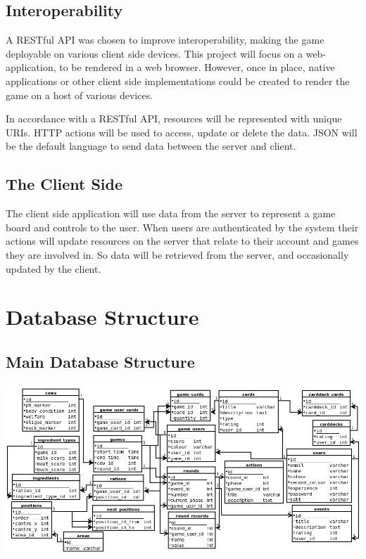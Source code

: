 \subsection{Interoperability}
A RESTful API was chosen to improve interoperability, making the game deployable on various client side devices. This project will focus on a web-application, to be rendered in a web browser. However, once in place, native applications or other client side implementations could be created to render the game on a host of various devices.

In accordance with a RESTful API, resources will be represented with unique URIs. HTTP actions will be used to access, update or delete the data. JSON will be the default language to send data between the server and client.

\subsection{The Client Side}
The client side application will use data from the server to represent a game board and controls to the user. When users are authenticated by the system their actions will update resources on the server that relate to their account and games they are involved in. So data will be retrieved from the server, and occasionally updated by the client.

\section{Database Structure}
\subsection{Main Database Structure}
\includegraphics[width=\textwidth]{Images/app3/full-database}

